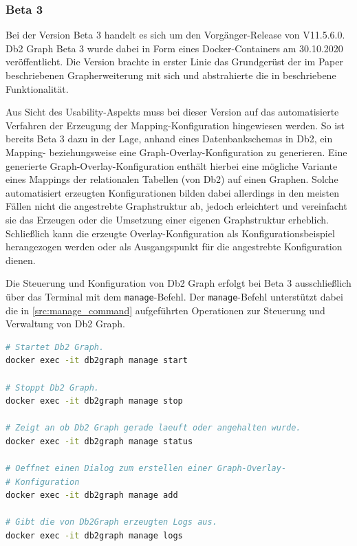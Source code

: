 \subsubsection{Beta 3}

Bei der Version Beta 3 handelt es sich um den Vorgänger-Release von V11.5.6.0. Db2 Graph Beta 3 wurde dabei in Form eines Docker-Containers am 30.10.2020 veröffentlicht. Die Version brachte in erster Linie das Grundgerüst der im Paper \cite{sigmod_tian} beschriebenen Grapherweiterung mit sich und abstrahierte die in \cite{sigmod_tian} beschriebene Funktionalität. 

Aus Sicht des Usability-Aspekts muss bei dieser Version auf das automatisierte Verfahren der Erzeugung der Mapping-Konfiguration hingewiesen werden. So ist bereits Beta 3 dazu in der Lage, anhand eines Datenbankschemas in Db2, ein Mapping- beziehungsweise eine Graph-Overlay-Konfiguration zu generieren. Eine generierte Graph-Overlay-Konfiguration enthält hierbei eine mögliche Variante eines Mappings der relationalen Tabellen (von Db2) auf einen Graphen. Solche automatisiert erzeugten Konfigurationen bilden dabei allerdings in den meisten Fällen nicht die angestrebte Graphstruktur ab, jedoch erleichtert und vereinfacht sie das Erzeugen oder die Umsetzung einer eigenen Graphstruktur erheblich. Schließlich kann die erzeugte Overlay-Konfiguration als Konfigurationsbeispiel herangezogen werden oder als Ausgangspunkt für die angestrebte Konfiguration dienen. 

Die Steuerung und Konfiguration von Db2 Graph erfolgt bei Beta 3 ausschließlich über das Terminal mit dem \texttt{manage}-Befehl. Der \texttt{manage}-Befehl unterstützt dabei die in \autoref{src:manage_command} aufgeführten Operationen zur Steuerung und Verwaltung von Db2 Graph. 

\begin{lstlisting}[label=src:manage_command,caption={Beispiel Steuerung und Verwaltung von  Db2 Graph Beta 3},language=BASH]
# Startet Db2 Graph.
docker exec -it db2graph manage start

# Stoppt Db2 Graph.
docker exec -it db2graph manage stop

# Zeigt an ob Db2 Graph gerade laeuft oder angehalten wurde.
docker exec -it db2graph manage status

# Oeffnet einen Dialog zum erstellen einer Graph-Overlay-
# Konfiguration
docker exec -it db2graph manage add

# Gibt die von Db2Graph erzeugten Logs aus.
docker exec -it db2graph manage logs
\end{lstlisting}

